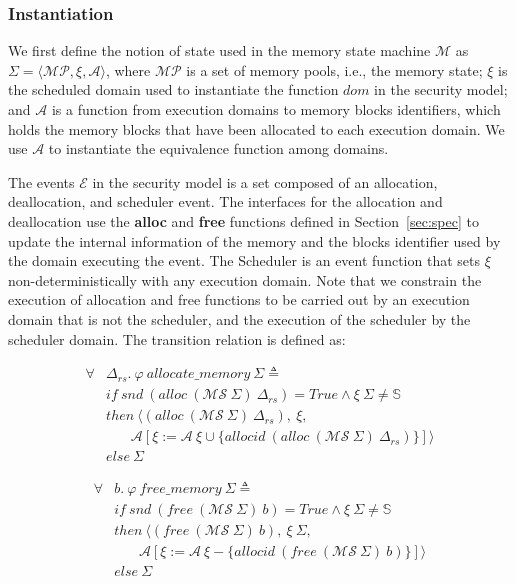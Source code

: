 \subsubsection{Instantiation}
We first define the notion of state used in the memory state machine $\mathcal{M}$ as $\Sigma = \langle \mathcal{MP}, \xi, \mathcal{A} \rangle$, where $\mathcal{MP}$ is a set of memory pools, i.e., the memory state; $\xi$ is the scheduled domain used to instantiate the function $dom$ in the security model; and $\mathcal{A}$ is a function from execution domains to memory blocks identifiers, which holds the memory blocks that have been allocated to each execution domain. We use $\mathcal{A}$ to instantiate the equivalence function among domains.

The events $\mathcal{E}$ in the security model is a set composed of an allocation, deallocation, and scheduler event. The interfaces for the allocation and deallocation use the \textbf{alloc} and \textbf{free} functions defined in Section~\ref{sec:spec} to update the internal information of the memory and the blocks identifier used by the domain executing the event. The Scheduler is an event function that sets $\xi$ non-deterministically with any execution domain. Note that we constrain the execution of allocation and free functions to be carried out by an execution domain that is not the scheduler, and the execution of the scheduler by the scheduler domain. The transition relation is defined as:

\begin{definition} 
\end{definition}
\vspace{-7pt}
\begin{align*}
\forall &\Delta_{rs}.\ \varphi\ allocate\_memory\ \Sigma \triangleq\\
&if\ snd\ (alloc\ (\mathcal{MS}\ \Sigma)\ \Delta_{rs}) = True \wedge \xi\ \Sigma \neq \mathbb{S}\\
&then\ \langle (alloc\ (\mathcal{MS}\ \Sigma)\ \Delta_{rs}),\ \xi,\\
&\ \ \ \ \ \ \ \ \mathcal{A}[\xi := \mathcal{A}\ \xi \cup \lbrace allocid\ (alloc\ (\mathcal{MS}\ \Sigma)\ \Delta_{rs}) \rbrace] \rangle\\
&else\ \Sigma
\end{align*}
\vspace{-12pt}

\begin{definition} 
\end{definition}
\vspace{-7pt}	
\begin{align*}
\forall &b.\ \varphi\ free\_memory\ \Sigma \triangleq\\ 
&if\ snd\ (free\ (\mathcal{MS}\ \Sigma)\ b) = True \wedge \xi\ \Sigma \neq \mathbb{S}\\
&then\ \langle (free\ (\mathcal{MS}\ \Sigma)\ b),\ \xi\ \Sigma,\\
&\ \ \ \ \ \ \ \ \mathcal{A}[\xi := \mathcal{A}\ \xi - \lbrace allocid\ (free\ (\mathcal{MS}\ \Sigma)\ b) \rbrace] \rangle\\
&else\ \Sigma
\end{align*}
\vspace{-12pt}

